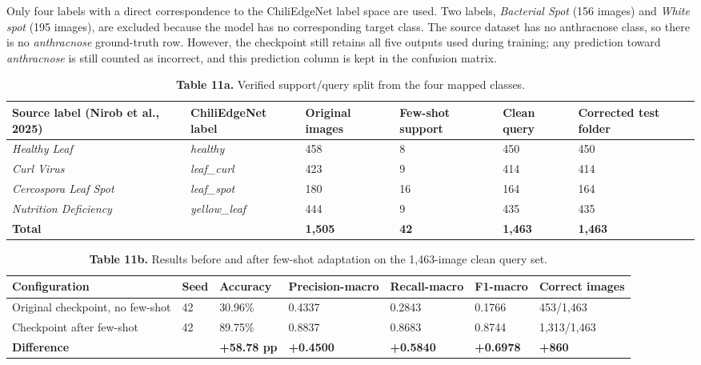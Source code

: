 Only four labels with a direct correspondence to the ChiliEdgeNet label space are used. Two labels, \emph{Bacterial Spot} (156 images) and \emph{White spot} (195 images), are excluded because the model has no corresponding target class. The source dataset has no anthracnose class, so there is no \emph{anthracnose} ground-truth row. However, the checkpoint still retains all five outputs used during training; any prediction toward \emph{anthracnose} is still counted as incorrect, and this prediction column is kept in the confusion matrix.

\begin{table}[!tb]
\centering
\caption*{\textbf{Table 11a.} Verified support/query split from the four mapped classes.}
\label{tab:11a}
\footnotesize
\renewcommand{\arraystretch}{1.15}
\begin{tabular}{llllll}
\toprule
\textbf{Source label (Nirob et al., 2025)} & \textbf{ChiliEdgeNet label} & \textbf{Original images} & \textbf{Few-shot support} & \textbf{Clean query} & \textbf{Corrected test folder} \\
\midrule
\emph{Healthy Leaf} & \emph{healthy} & 458 & 8 & 450 & 450 \\
\emph{Curl Virus} & \emph{leaf\_curl} & 423 & 9 & 414 & 414 \\
\emph{Cercospora Leaf Spot} & \emph{leaf\_spot} & 180 & 16 & 164 & 164 \\
\emph{Nutrition Deficiency} & \emph{yellow\_leaf} & 444 & 9 & 435 & 435 \\
\textbf{Total} & & \textbf{1,505} & \textbf{42} & \textbf{1,463} & \textbf{1,463} \\
\bottomrule
\end{tabular}
\end{table}

\begin{table}[!tb]
\centering
\caption*{\textbf{Table 11b.} Results before and after few-shot adaptation on the 1,463-image clean query set.}
\label{tab:11b}
\footnotesize
\setlength{\tabcolsep}{2pt}
\renewcommand{\arraystretch}{1.15}
\begin{tabular}{lllllll}
\toprule
\textbf{Configuration} & \textbf{Seed} & \textbf{Accuracy} & \textbf{Precision-macro} & \textbf{Recall-macro} & \textbf{F1-macro} & \textbf{Correct images} \\
\midrule
Original checkpoint, no few-shot & 42 & 30.96\% & 0.4337 & 0.2843 & 0.1766 & 453/1,463 \\
Checkpoint after few-shot & 42 & 89.75\% & 0.8837 & 0.8683 & 0.8744 & 1,313/1,463 \\
\textbf{Difference} & & \textbf{+58.78 pp} & \textbf{+0.4500} & \textbf{+0.5840} & \textbf{+0.6978} & \textbf{+860} \\
\bottomrule
\end{tabular}
\end{table}

